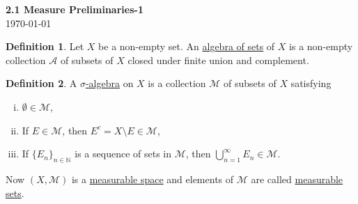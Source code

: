 \documentclass[11pt]{article}
\theoremstyle{definition}
\newtheorem{definition}{Definition}[section]
\theoremstyle{remark}
\begin{document}
\begin{center}
{\Large\textbf{2.1 Measure Preliminaries-1}}\\
\vspace{0.3cm}
{\normalsize\today}
\end{center}
\vspace{0.5cm}


\begin{definition}\label{def:algebra_of_sets}
Let $X$ be a non-empty set. An \underline{algebra of sets} of $X$ is a non-empty collection $\mathcal{A}$ of subsets of $X$ closed under finite union and complement.
\end{definition}

\begin{definition}\label{def:sigma_algebra}
A \underline{$\sigma$-algebra} on $X$ is a collection $\mathcal{M}$ of subsets of $X$ satisfying
\begin{enumerate}[(i)]
    \item $\emptyset \in \mathcal{M}$,
    \item If $E \in \mathcal{M}$, then $E^c = X \setminus E \in \mathcal{M}$,
    \item If $\{E_n\}_{n \in \mathbb{N}}$ is a sequence of sets in $\mathcal{M}$, then $\bigcup_{n=1}^\infty E_n \in \mathcal{M}$.
\end{enumerate}
Now $(X, \mathcal{M})$ is a \underline{measurable space} and elements of $\mathcal{M}$ are called \underline{measurable sets}.
\end{definition}
\end{document}
